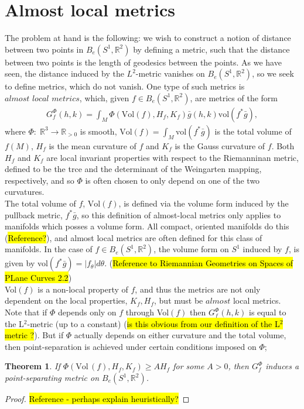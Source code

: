\documentclass[a4,danish]{article}
\theoremstyle{break}
\newtheorem{theorem}[subsection]{Theorem}
\theoremstyle{definition}
\theoremstyle{Break}
\newcommand{\R}{\mathbb{R}}
\begin{document}

\section*{Almost local metrics}
\label{sec:al-metrics}

The problem at hand is the following: we wish to construct a notion of distance between two points in $B_e(S^1,\R^2)$ by defining a metric, such that the distance between two points is the length of geodesics between the points. As we have seen, the distance induced by the $L^2$-metric vanishes on $B_e(S^1, \R^2)$, so we seek to define metrics, which do not vanish. One type of such metrics is $\textit{almost local metrics}$, which, given $f \in B_e(S^1, \R^2)$, are metrics of the form
\begin{align*}
G_f^\Phi (h,k) = \int_M \Phi(\text{Vol}(f), H_f, K_f) \bar{g}(h,k) \text{vol}(f^* \bar{g}),
\end{align*}
where $\Phi: \; \R^3 \rightarrow \R_{> 0}$ is smooth, $\text{Vol}(f) = \int_M \text{vol}(f^* \bar{g})$ is the total volume of $f(M)$, $H_f$ is the mean curvature of $f$ and $K_f$ is the Gauss curvature of $f$. Both $H_f$ and $K_f$ are local invariant properties with respect to the Riemanninan metric, defined to be the trce and the determinant of the Weingarten mapping, respectively, and so $\Phi$ is often chosen to only depend on one of the two curvatures. \\[0.2 cm]
The total volume of $f$, $\text{Vol}(f)$, is defined via the volume form induced by the pullback metric, $f^*\bar{g}$, so this definition of almost-local metrics only applies to manifolds which posses a volume form. All compact, oriented manifolds do this (\hl{Reference?}), and almost local metrics are often defined for this class of manifolds. In the case of $f \in B_e(S^1, \R^2)$, the volume form on $S^1$ induced by $f$, is given by vol$(f^*\bar{g}) = \left| f_\theta \right| d \theta$. (\hl{Reference to Riemannian Geometries on Spaces of PLane Curves 2.2}) \\[0.2 cm] 
Vol$(f)$ is a non-local property of $f$, and thus the metrics are not only dependent on the local properties, $K_f, H_f$, but must be $\textit{almost}$ local metrics. \\[0.2 cm]
Note that if $\Phi$ depends only on $f$ through Vol$(f)$ then $G_f^\Phi (h,k)$ is equal to the L$^2$-metric (up to a constant) (\hl{is this obvious from our definition of the L$^2$ metric ?}). But if $\Phi$ actually depends on either curvature and the total volume, then point-separation is achieved under certain conditions imposed on $\Phi$;

\begin{theorem}
If $\Phi(\text{Vol} \, (f), H_f, K_f) \geq A H_f$ for some $A > 0$, then $G_f^\Phi$ induces a point-separating metric on $B_e(S^1, \R^2)$.
\end{theorem}

\begin{proof}
\hl{Reference - perhaps explain heuristically?}
\end{proof}
\end{document}
